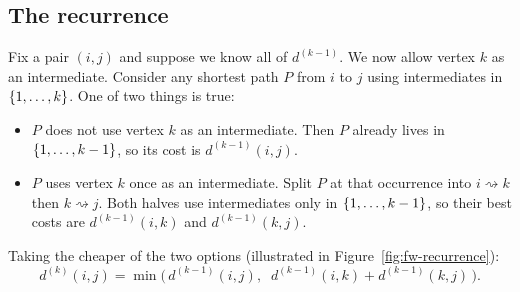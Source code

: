 \subsection{The recurrence}

Fix a pair $(i,j)$ and suppose we know all of $d^{(k-1)}$. We now allow vertex $k$ as an intermediate. Consider any
shortest path $P$ from $i$ to $j$ using intermediates in $\{1,\dots,k\}$. One of two things
is true:

\begin{itemize}
  \item $P$ does not use vertex $k$ as an intermediate. Then $P$ already lives in $\{1,\dots,k-1\}$,
        so its cost is $d^{(k-1)}(i,j)$.
  \item $P$ uses vertex $k$ once as an intermediate. Split $P$ at
        that occurrence into $i \rightsquigarrow k$ then $k \rightsquigarrow j$. Both halves use
        intermediates only in $\{1,\dots,k-1\}$, so their best costs are $d^{(k-1)}(i,k)$ and
        $d^{(k-1)}(k,j)$.
\end{itemize}

Taking the cheaper of the two options (illustrated in Figure~\ref{fig:fw-recurrence}):
\begin{equation}
  d^{(k)}(i,j) = \min\!\Big(\, d^{(k-1)}(i,j),\;\; d^{(k-1)}(i,k) + d^{(k-1)}(k,j)\,\Big).
  \label{ch09:fw-recurrence}
\end{equation}

